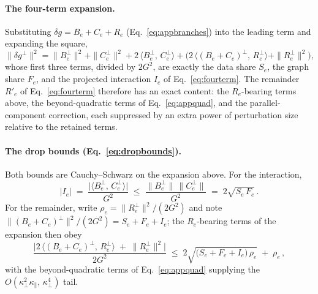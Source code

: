 \paragraph{The four-term expansion.} Substituting
$\delta g = B_e + C_e + R_e$ (Eq.~\ref{eq:appbranches}) into the leading
term and expanding the square,
\begin{equation*}
\|\delta g^{\perp}\|^2
= \|B_e^{\perp}\|^2 + \|C_e^{\perp}\|^2
+ 2\,\langle B_e^{\perp},\, C_e^{\perp}\rangle
+ \Big(2\,\langle (B_e{+}C_e)^{\perp},\, R_e^{\perp}\rangle
+ \|R_e^{\perp}\|^2\Big),
\end{equation*}
whose first three terms, divided by $2G^2$, are exactly the data
share $S_e$, the graph share $F_e$, and the projected interaction
$I_e$ of Eq.~\ref{eq:fourterm}. The remainder $R'_e$ of
Eq.~\ref{eq:fourterm} therefore has an exact content: the
$R_e$-bearing terms above, the beyond-quadratic terms of
Eq.~\ref{eq:appquad}, and the parallel-component correction, each
suppressed by an extra power of perturbation size relative to the
retained terms.

\paragraph{The drop bounds (Eq.~\ref{eq:dropbounds}).} Both bounds are
Cauchy--Schwarz on the expansion above. For the interaction,
\begin{equation*}
|I_e| \;=\; \frac{\big|\langle B_e^{\perp},\,
C_e^{\perp}\rangle\big|}{G^2}
\;\le\; \frac{\|B_e^{\perp}\|\,\|C_e^{\perp}\|}{G^2}
\;=\; 2\sqrt{S_e\,F_e}\,.
\end{equation*}
For the remainder, write $\rho_e = \|R_e^{\perp}\|^2/(2G^2)$ and note
$\|(B_e{+}C_e)^{\perp}\|^2/(2G^2) = S_e + F_e + I_e$; the
$R_e$-bearing terms of the expansion then obey
\begin{equation*}
\frac{\big|2\,\langle (B_e{+}C_e)^{\perp},\, R_e^{\perp}\rangle
\;+\; \|R_e^{\perp}\|^2\big|}{2G^2}
\;\le\; 2\sqrt{\big(S_e + F_e + I_e\big)\,\rho_e} \;+\; \rho_e\,,
\end{equation*}
with the beyond-quadratic terms of Eq.~\ref{eq:appquad} supplying the
$O(\kappa_\perp^2\kappa_\parallel,\, \kappa_\perp^4)$ tail.

